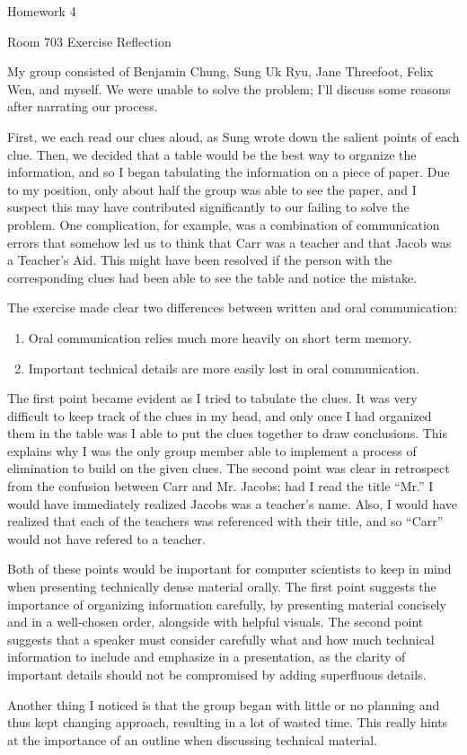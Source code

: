 \documentclass[11pt]{article}
\makeatletter
\newcommand{\myname}{Shashank Singh}
\newcommand{\myemail}{sss1@andrew.cmu.edu}
\newcommand{\myclassnum}{15-221}
\newcommand{\mysem}{Summer 2013}
\newcommand{\mysection}{Section M}
\newcommand{\theassignment}{Homework 4}
\newcommand{\thetitle}{Room 703 Exercise Reflection}
\newcommand{\thedate}{06/12/2013}
\makeatother
\begin{document}
\lhead{\myname\\\myemail\\\thedate}
\rhead{\myclassnum\\\mysem\\\mysection}

\begin{center}
\theassignment

\thetitle
\end{center}

My group consisted of Benjamin Chung, Sung Uk Ryu, Jane Threefoot, Felix Wen,
and myself. We were unable to solve the problem; I'll discuss some reasons
after narrating our process.

First, we each read our clues aloud, as Sung wrote down the salient points of
each clue. Then, we decided that a table would be the best way to organize the
information, and so I began tabulating the information on a piece of paper. Due
to my position, only about half the group was able to see the paper, and I
suspect this may have contributed significantly to our failing to solve the
problem. One complication, for example, was a combination of
communication errors that somehow led us to think that Carr was a teacher and
that Jacob was a Teacher's Aid. This might have been resolved if the person
with the corresponding clues had been able to see the table and notice the
mistake.

The exercise made clear two differences between written and oral
communication:
\begin{enumerate}
\item Oral communication relies much more heavily on short term memory.
\item Important technical details are more easily lost in oral communication.
\end{enumerate}
The first point became evident as I tried to tabulate the clues. It was very
difficult to keep track of the clues in my head, and only once I had organized
them in the table was I able to put the clues together to draw conclusions.
This explains why I was the only group member able to implement a process of
elimination to build on the given clues. The second point was clear in
retrospect from the confusion between Carr and Mr. Jacobs; had I read the title
``Mr.'' I would have immediately realized Jacobs was a teacher's name. Also, I
would have realized that each of the teachers was referenced with their title,
and so ``Carr'' would not have refered to a teacher.

Both of these points would be important for computer scientists to keep in mind
when presenting technically dense material orally. The first point suggests
the importance of organizing information carefully, by presenting material
concisely and in a well-chosen order, alongside with helpful visuals. The
second point suggests that a speaker must consider carefully what and how much
technical information to include and emphasize in a presentation, as the
clarity of important details should not be compromised by adding superfluous
details.

Another thing I noticed is that the group began with little or no planning and
thus kept changing approach, resulting in a lot of wasted time. This really
hints at the importance of an outline when discussing technical material.
\end{document}
